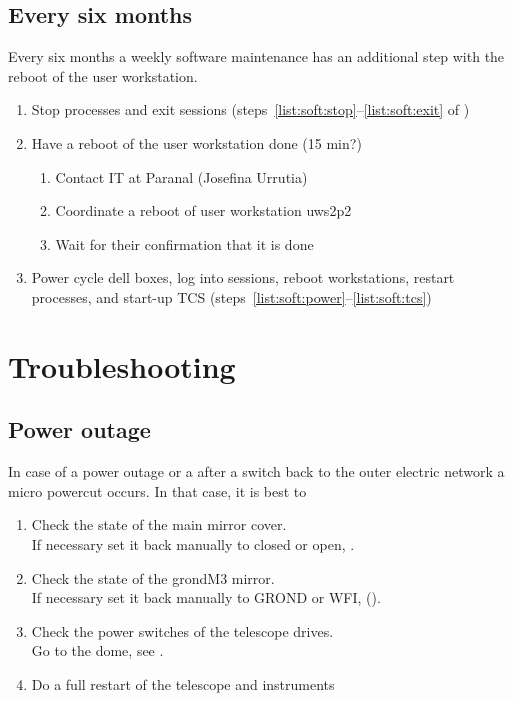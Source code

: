\documentclass[11pt,fleqn,a4paper]{book}
\begin{document}
\section{Every six months}

Every six months a weekly software maintenance has an additional step with the reboot of the user workstation.

\begin{enumerate}
\item Stop processes and exit sessions (steps~\ref{list:soft:stop}--\ref{list:soft:exit} of )
\item Have a reboot of the user workstation done (15 min?)
    \begin{enumerate}
        \item Contact IT at Paranal (Josefina Urrutia) 
        \item Coordinate a reboot of user workstation \gls{uws2p2}
        \item Wait for their confirmation that it is done
    \end{enumerate}
\item Power cycle dell boxes, log into sessions, reboot workstations, restart processes, and start-up TCS (steps~\ref{list:soft:power}--\ref{list:soft:tcs})
\end{enumerate}


\chapter{Troubleshooting}
\label{chap:trouble}

\section{Power outage}
\label{sec:power}

In case of a power outage or a after a switch back to the outer electric network a micro powercut occurs.  In that case, it is best to

\begin{enumerate}
    \item Check the state of the \gls{main mirror} cover.\\
          If necessary set it back manually to closed or open, .
    \item Check the state of the \gls{grondM3} mirror.\\
          If necessary set it back manually to GROND or WFI,  ().
    \item Check the power switches of the telescope drives.\\
          Go to the dome, see .
    \item Do a full restart of the telescope and instruments
\end{enumerate}
\end{document}
